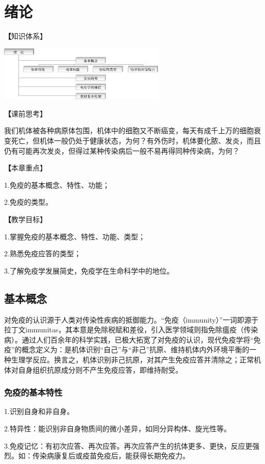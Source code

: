 \chapter{绪论}

{\textbf 【知识体系】}
\begin{center}
\includegraphics[width=0.6\textwidth]{./images/Image00007.jpg}
\end{center}
{\textbf 【课前思考】}

我们机体被各种病原体包围，机体中的细胞又不断癌变，每天有成千上万的细胞衰变死亡，但机体一般仍处于健康状态，为何？有外伤时，机体要化脓、发炎，而且仍有可能再次发炎，但得过某种传染病后一般不易再得同种传染病，为何？

{\textbf 【本章重点】}

1.免疫的基本概念、特性、功能；

2.免疫的类型。

{\textbf 【教学目标】}

1.掌握免疫的基本概念、特性、功能、类型；

2.熟悉免疫应答的类型；

3.了解免疫学发展简史，免疫学在生命科学中的地位。

\section{基本概念}

对免疫的认识源于人类对传染性疾病的抵御能力。“免疫（immunity）”一词即源于拉丁文immunitas，其本意是免除税赋和差役，引入医学领域则指免除瘟疫（传染病）。通过人们百余年的科学实践，已极大拓宽了对免疫的认识，现代免疫学将“免疫”的概念定义为：是机体识别“自己”与“非己”抗原、维持机体内外环境平衡的一种生理学反应。换言之，机体识别非己抗原，对其产生免疫应答并清除之；正常机体对自身组织抗原成分则不产生免疫应答，即维持耐受。


\subsection{免疫的基本特性}

1.识别自身和非自身。

2.特异性：能识别非自身物质间的微小差异，如同分异构体、旋光性等。

3.免疫记忆：有初次应答、再次应答。再次应答产生的抗体更多、更快，反应更强烈。如：传染病康复后或疫苗免疫后，能获得长期免疫力。


